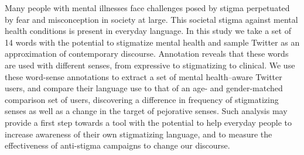 Many people with mental illnesses face challenges posed by stigma perpetuated by fear and misconception in society at large. This societal stigma against mental health conditions is present in everyday language. In this study we take a set of 14 words with the potential to stigmatize mental health and sample Twitter as an approximation of contemporary discourse. Annotation reveals that these words are used with different senses, from expressive to stigmatizing to clinical. We use these word-sense annotations to extract a set of mental health--aware Twitter users, and compare their language use to that of an age- and gender-matched comparison set of users, discovering a difference in frequency of stigmatizing senses as well as a change in the target of pejorative senses. Such analysis may provide a first step towards a tool with the potential to help everyday people to increase awareness of their own stigmatizing language, and to measure the effectiveness of anti-stigma campaigns to change our discourse.
